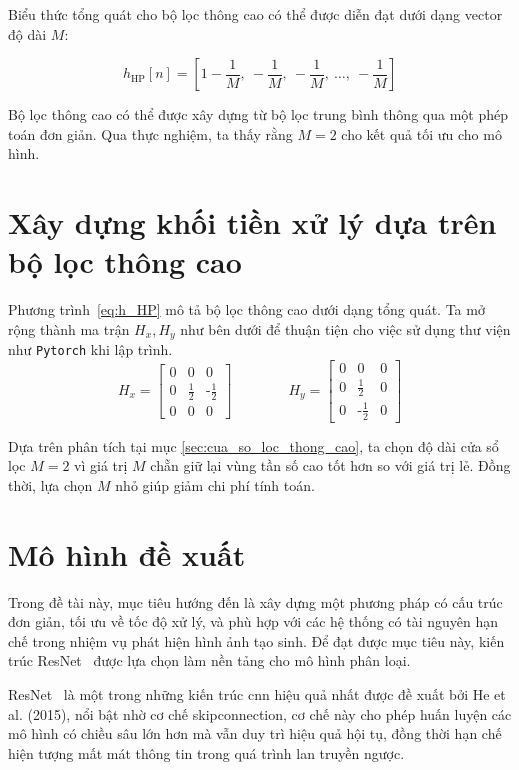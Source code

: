 Biểu thức tổng quát cho bộ lọc thông cao có thể được diễn đạt dưới dạng vector độ dài \( M \):

\begin{equation}
	\label{eq:h_HP}
	h_{\mathrm{HP}}[n] = \left[ 1 - \frac{1}{M},\ -\frac{1}{M},\ -\frac{1}{M},\ \ldots,\ -\frac{1}{M} \right]
\end{equation}
%

Bộ lọc thông cao có thể được xây dựng từ bộ lọc trung bình thông qua một phép toán đơn giản. Qua thực nghiệm, ta thấy rằng \( M = 2 \) cho kết quả tối ưu cho mô hình.
%
%
\section{Xây dựng khối tiền xử lý dựa trên bộ lọc thông cao}
Phương trình~\eqref{eq:h_HP} mô tả bộ lọc thông cao dưới dạng tổng quát. Ta mở rộng thành ma trận $H_x, H_y$ như bên dưới để thuận tiện cho việc sử dụng thư viện như \texttt{Pytorch} khi lập trình.
	\[
	H_x = \begin{bmatrix}
		0 & 0 & 0 \\
		0 & \tfrac{1}{2} &  \text{-}\tfrac{1}{2} \\
		0 & 0 & 0
	\end{bmatrix} \qquad \qquad
	H_y = \begin{bmatrix}
		0 & 0 & 0 \\
		0 & \tfrac{1}{2} &  0 \\
		0 & \text{-}\tfrac{1}{2} & 0
	\end{bmatrix}
	\]
	
Dựa trên phân tích tại mục \ref{sec:cua_so_loc_thong_cao}, ta chọn độ dài cửa sổ lọc $M=2$ vì giá trị $M$ chẵn giữ lại vùng tần số cao tốt hơn so với giá trị lẻ. Đồng thời, lựa chọn $M$ nhỏ giúp giảm chi phí tính toán.

\section{Mô hình đề xuất}

Trong đề tài này, mục tiêu hướng đến là xây dựng một phương pháp có cấu trúc đơn giản, tối ưu về tốc độ xử lý, và phù hợp với các hệ thống có tài nguyên hạn chế trong nhiệm vụ phát hiện hình ảnh tạo sinh. Để đạt được mục tiêu này, kiến trúc ResNet~\cite{He2015DeepRL} được lựa chọn làm nền tảng cho mô hình phân loại.

ResNet~\cite{He2015DeepRL} là một trong những kiến trúc \gls{cnn} hiệu quả nhất được đề xuất bởi He et al. (2015), nổi bật nhờ cơ chế \gls{skipconnection}, cơ chế này cho phép huấn luyện các mô hình có chiều sâu lớn hơn mà vẫn duy trì hiệu quả hội tụ, đồng thời hạn chế hiện tượng mất mát thông tin trong quá trình lan truyền ngược.

